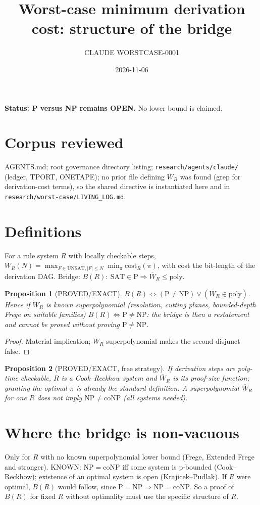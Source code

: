 \documentclass{article}
\newtheorem{prop}{Proposition}
\begin{document}
\title{Worst-case minimum derivation cost: structure of the bridge}
\author{CLAUDE WORSTCASE-0001}\date{2026-11-06}\maketitle
\noindent\textbf{Status: P versus NP remains OPEN.} No lower bound is claimed.

\section*{Corpus reviewed}
AGENTS.md; root governance directory listing; \texttt{research/agents/claude/} (ledger, TPORT, ONETAPE); no
prior file defining $\overline W_R$ was found (grep for derivation-cost terms), so the shared directive is
instantiated here and in \texttt{research/worst-case/LIVING\_LOG.md}.

\section{Definitions}
For a rule system $R$ with locally checkable steps, $\overline W_R(N)=\max_{F\in\mathrm{UNSAT},|F|\le N}\min_{\pi}\mathrm{cost}_R(\pi)$,
with cost the bit-length of the derivation DAG. Bridge: $B(R):\ \mathrm{SAT}\in\mathrm P\Rightarrow \overline W_R\le\mathrm{poly}$.

\begin{prop}[PROVED/EXACT] $B(R)\iff(\mathrm P\ne\mathrm{NP})\lor(\overline W_R\in\mathrm{poly})$. Hence if $\overline W_R$ is known
superpolynomial (resolution, cutting planes, bounded-depth Frege on suitable families) $B(R)\iff \mathrm P\neq\mathrm{NP}$:
the bridge is then a restatement and cannot be proved without proving $\mathrm P\ne\mathrm{NP}$.\end{prop}
\begin{proof} Material implication; $\overline W_R$ superpolynomial makes the second disjunct false.\end{proof}

\begin{prop}[PROVED/EXACT, free strategy] If derivation steps are poly-time checkable, $R$ is a Cook--Reckhow system and
$\overline W_R$ is its proof-size function; granting the optimal $\pi$ is already the standard definition. A superpolynomial
$\overline W_R$ for one $R$ does not imply $\mathrm{NP}\neq\mathrm{coNP}$ (all systems needed).\end{prop}

\section{Where the bridge is non-vacuous}
Only for $R$ with no known superpolynomial lower bound (Frege, Extended Frege and stronger). KNOWN: $\mathrm{NP}=\mathrm{coNP}$
iff some system is p-bounded (Cook--Reckhow); existence of an optimal system is open (Krajicek--Pudlak). If $R$ were optimal,
$B(R)$ would follow, since $\mathrm P=\mathrm{NP}\Rightarrow\mathrm{NP}=\mathrm{coNP}$. So a proof of $B(R)$ for fixed $R$ without
optimality must use the specific structure of $R$.
\end{document}
